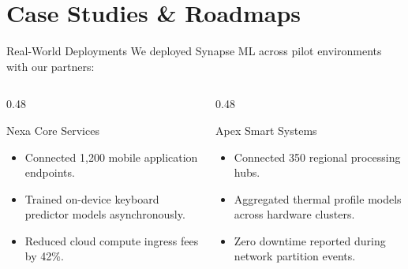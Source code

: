 \section{Case Studies \& Roadmaps}

\begin{frame}{Real-World Deployments}
  We deployed Synapse ML across pilot environments with our partners:
  \vspace{0.3cm}
  \begin{columns}[T]
    \begin{column}{0.48\textwidth}
      \begin{block}{Nexa Core Services}
        \begin{itemize}
          \item Connected 1,200 mobile application endpoints.
          \item Trained on-device keyboard predictor models asynchronously.
          \item Reduced cloud compute ingress fees by 42\%.
        \end{itemize}
      \end{block}
    \end{column}
    \begin{column}{0.48\textwidth}
      \begin{block}{Apex Smart Systems}
        \begin{itemize}
          \item Connected 350 regional processing hubs.
          \item Aggregated thermal profile models across hardware clusters.
          \item Zero downtime reported during network partition events.
        \end{itemize}
      \end{block}
    \end{column}
  \end{columns}
\end{frame}

